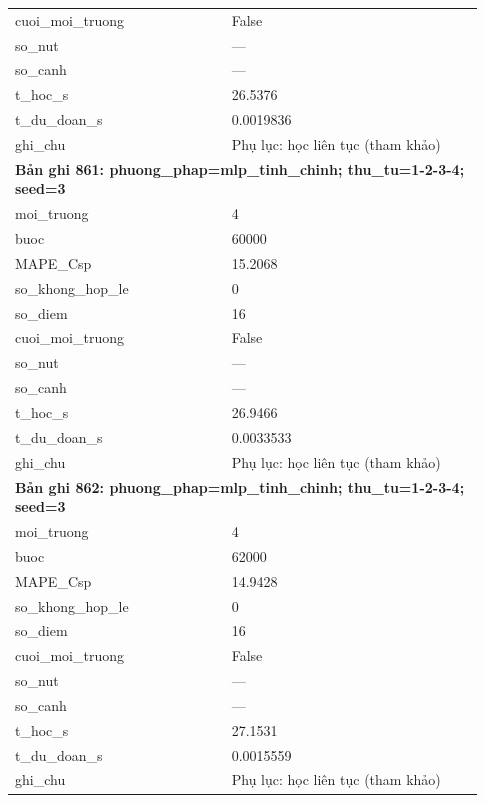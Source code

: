 \begin{longtable}{p{0.43\linewidth}p{0.50\linewidth}}
cuoi\_\allowbreak moi\_\allowbreak truong & False \\
so\_\allowbreak nut & — \\
so\_\allowbreak canh & — \\
t\_\allowbreak hoc\_\allowbreak s & 26.5376 \\
t\_\allowbreak du\_\allowbreak doan\_\allowbreak s & 0.0019836 \\
ghi\_\allowbreak chu & Phụ lục: học liên tục (tham khảo) \\
\midrule
\multicolumn{2}{p{0.95\linewidth}}{\textbf{Bản ghi 861: phuong\_phap=mlp\_tinh\_chinh; thu\_tu=1-2-3-4; seed=3}} \\
moi\_\allowbreak truong & 4 \\
buoc & 60000 \\
MAPE\_\allowbreak Csp & 15.2068 \\
so\_\allowbreak khong\_\allowbreak hop\_\allowbreak le & 0 \\
so\_\allowbreak diem & 16 \\
cuoi\_\allowbreak moi\_\allowbreak truong & False \\
so\_\allowbreak nut & — \\
so\_\allowbreak canh & — \\
t\_\allowbreak hoc\_\allowbreak s & 26.9466 \\
t\_\allowbreak du\_\allowbreak doan\_\allowbreak s & 0.0033533 \\
ghi\_\allowbreak chu & Phụ lục: học liên tục (tham khảo) \\
\midrule
\multicolumn{2}{p{0.95\linewidth}}{\textbf{Bản ghi 862: phuong\_phap=mlp\_tinh\_chinh; thu\_tu=1-2-3-4; seed=3}} \\
moi\_\allowbreak truong & 4 \\
buoc & 62000 \\
MAPE\_\allowbreak Csp & 14.9428 \\
so\_\allowbreak khong\_\allowbreak hop\_\allowbreak le & 0 \\
so\_\allowbreak diem & 16 \\
cuoi\_\allowbreak moi\_\allowbreak truong & False \\
so\_\allowbreak nut & — \\
so\_\allowbreak canh & — \\
t\_\allowbreak hoc\_\allowbreak s & 27.1531 \\
t\_\allowbreak du\_\allowbreak doan\_\allowbreak s & 0.0015559 \\
ghi\_\allowbreak chu & Phụ lục: học liên tục (tham khảo) \\

\end{longtable}
